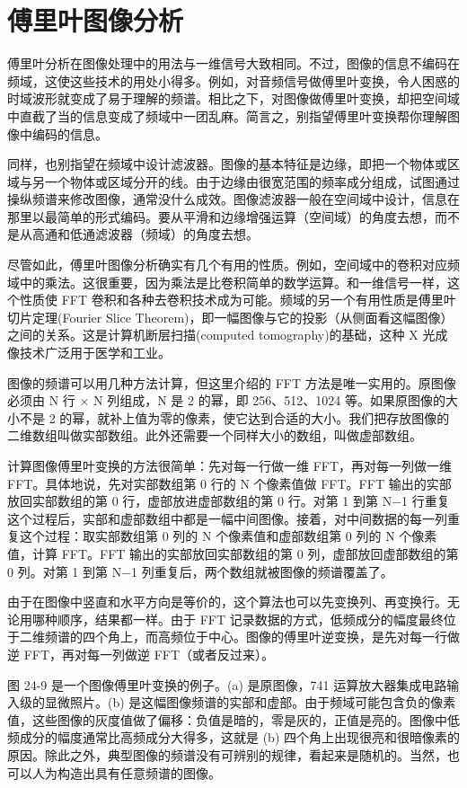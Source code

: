 \section{傅里叶图像分析}

傅里叶分析在图像处理中的用法与一维信号大致相同。不过，图像的信息不编码在频域，这使这些技术的用处小得多。例如，对音频信号做傅里叶变换，令人困惑的时域波形就变成了易于理解的频谱。相比之下，对图像做傅里叶变换，却把空间域中直截了当的信息变成了频域中一团乱麻。简言之，别指望傅里叶变换帮你理解图像中编码的信息。

同样，也别指望在频域中设计滤波器。图像的基本特征是边缘，即把一个物体或区域与另一个物体或区域分开的线。由于边缘由很宽范围的频率成分组成，试图通过操纵频谱来修改图像，通常没什么成效。图像滤波器一般在空间域中设计，信息在那里以最简单的形式编码。要从平滑和边缘增强运算（空间域）的角度去想，而不是从高通和低通滤波器（频域）的角度去想。

尽管如此，傅里叶图像分析确实有几个有用的性质。例如，空间域中的卷积对应频域中的乘法。这很重要，因为乘法是比卷积简单的数学运算。和一维信号一样，这个性质使
FFT
卷积和各种去卷积技术成为可能。频域的另一个有用性质是傅里叶切片定理(Fourier
Slice
Theorem)，即一幅图像与它的投影（从侧面看这幅图像）之间的关系。这是计算机断层扫描(computed
tomography)的基础，这种 X 光成像技术广泛用于医学和工业。

图像的频谱可以用几种方法计算，但这里介绍的 FFT
方法是唯一实用的。原图像必须由 N 行 × N 列组成，N 是 2 的幂，即
256、512、1024 等。如果原图像的大小不是 2
的幂，就补上值为零的像素，使它达到合适的大小。我们把存放图像的二维数组叫做实部数组。此外还需要一个同样大小的数组，叫做虚部数组。

计算图像傅里叶变换的方法很简单：先对每一行做一维 FFT，再对每一列做一维
FFT。具体地说，先对实部数组第 0 行的 N 个像素值做 FFT。FFT
输出的实部放回实部数组的第 0 行，虚部放进虚部数组的第 0 行。对第 1 到第
N−1
行重复这个过程后，实部和虚部数组中都是一幅中间图像。接着，对中间数据的每一列重复这个过程：取实部数组第
0 列的 N 个像素值和虚部数组第 0 列的 N 个像素值，计算 FFT。FFT
输出的实部放回实部数组的第 0 列，虚部放回虚部数组的第 0 列。对第 1 到第
N−1 列重复后，两个数组就被图像的频谱覆盖了。

由于在图像中竖直和水平方向是等价的，这个算法也可以先变换列、再变换行。无论用哪种顺序，结果都一样。由于
FFT
记录数据的方式，低频成分的幅度最终位于二维频谱的四个角上，而高频位于中心。图像的傅里叶逆变换，是先对每一行做逆
FFT，再对每一列做逆 FFT（或者反过来）。

图 24-9 是一个图像傅里叶变换的例子。(a) 是原图像，741
运算放大器集成电路输入级的显微照片。(b)
是这幅图像频谱的实部和虚部。由于频域可能包含负的像素值，这些图像的灰度值做了偏移：负值是暗的，零是灰的，正值是亮的。图像中低频成分的幅度通常比高频成分大得多，这就是
(b)
四个角上出现很亮和很暗像素的原因。除此之外，典型图像的频谱没有可辨别的规律，看起来是随机的。当然，也可以人为构造出具有任意频谱的图像。

